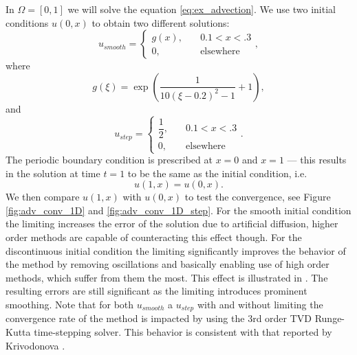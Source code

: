 \begin{example}[Advection 1D]
\label{ex:adv1D}
In $\Omega = [0, 1]$ we will solve the equation \eqref{eq:ex_advection}.
We use two initial conditions $u(0, x)$ to obtain two different solutions:
\begin{equation}
u_{smooth} = \begin{cases}
g(x),\quad &0.1 < x < .3\\
0, \quad &\text{elsewhere}
\end{cases},
\end{equation}
where
\begin{equation}
g(\xi) = \exp\left(\frac{1}{10(\xi - 0.2)^2 - 1}+ 1\right),
\end{equation}
and
\begin{equation}
u_{step} = \begin{cases}
\dfrac{1}{2},\quad &0.1 < x < .3\\
0, \quad &\text{elsewhere}
\end{cases}.
\end{equation}
The periodic boundary condition is prescribed at $x = 0$ and $x = 1$ --- this
results in the solution at time $t = 1$ to be the same as the initial condition,
i.e.
\begin{equation}
u(1, x) = u(0, x).
\end{equation}
We then compare $u(1, x)$ with $u(0, x)$ to test the convergence, see Figure
\ref{fig:adv_conv_1D} and \ref{fig:adv_conv_1D_step}. For the smooth initial condition
the limiting increases the error of the solution due to artificial diffusion, higher order
methods are capable of counteracting this effect though. For the discontinuous initial
condition the limiting significantly improves the behavior of the method by removing 
oscillations and basically enabling use of high order methods, which suffer from them the 
most. This effect is illustrated in . The
resulting errors are still significant as the limiting introduces prominent
smoothing. Note that for both $u_{smooth}$ a $u_{step}$ with and without limiting the
convergence rate of the method is impacted by using the 3rd order TVD Runge-Kutta
time-stepping solver. This behavior is consistent with that reported by Krivodonova
\cite{Krivodonova2007}.

\end{example}
